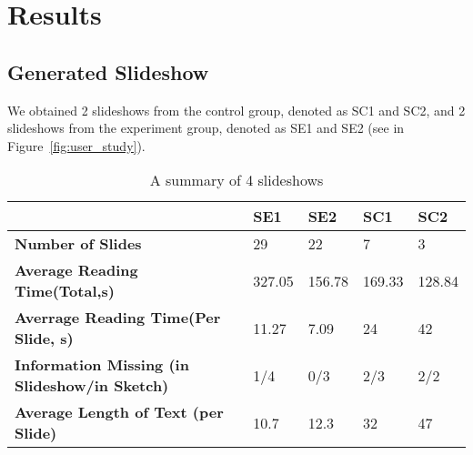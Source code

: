 \section{Results}

\subsection{Generated Slideshow}
We obtained 2 slideshows from the control group, denoted as SC1 and SC2, and 2 slideshows from the experiment group, denoted as SE1 and SE2 (see in Figure~\ref{fig:user_study}). 


\begin{table}
  \caption{A summary of 4 slideshows}
  \label{tab:slides1}
  \small
  \centering
  \begin{tabu}{p{2cm}|p{0.9cm}|p{0.9cm}|p{0.9cm}|p{0.9cm}}
  \toprule
 \textbf{} &\textbf{SE1} & \textbf{SE2} & \textbf{SC1}& \textbf{SC2} \\ 
   \midrule
  \textbf{Number of Slides } & 29  & 22 & 7 & 3 \\ 
 \midrule
  \textbf{Average Reading Time(Total,s)} & 327.05 & 156.78 & 169.33 & 128.84\\ 
 \midrule
  \textbf{Averrage Reading Time(Per Slide, s)} & 11.27 & 7.09 &24 & 42\\ 
   \midrule
  \textbf{Information Missing (in Slideshow/in Sketch) }& 1/4 & 0/3 & 2/3 & 2/2\\ 
     \midrule
  \textbf{Average Length of Text (per Slide) }& 10.7 & 12.3 & 32 & 47\\ 
    
  \bottomrule

  \end{tabu}
  \vspace{1mm}
\end{table}



